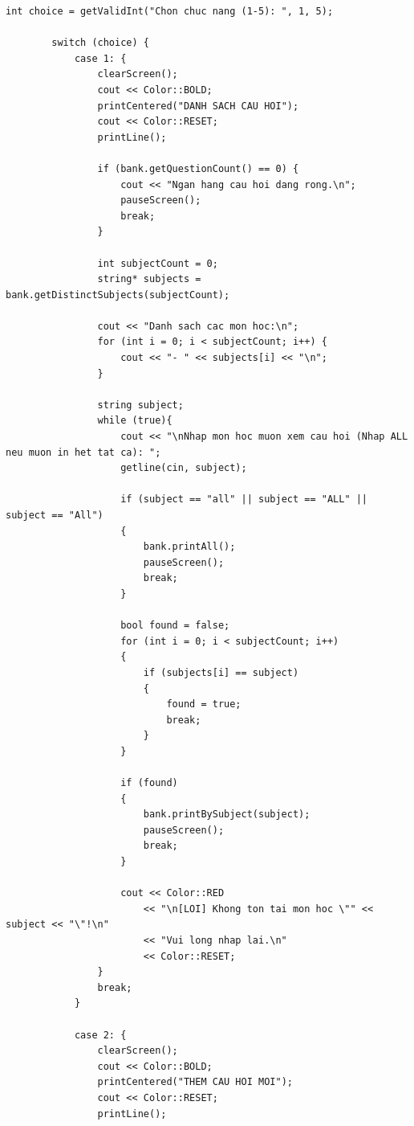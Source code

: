 \documentclass[11pt]{report}
\begin{document}
\begin{lstlisting}[caption={Menu.cpp -- Cài đặt giao diện Menu và điều hướng}, label={lst:full_menu_cpp}]
        int choice = getValidInt("Chon chuc nang (1-5): ", 1, 5);

        switch (choice) {
            case 1: {
                clearScreen();
                cout << Color::BOLD;
                printCentered("DANH SACH CAU HOI");
                cout << Color::RESET;
                printLine();

                if (bank.getQuestionCount() == 0) {
                    cout << "Ngan hang cau hoi dang rong.\n";
                    pauseScreen();
                    break;
                }

                int subjectCount = 0;
                string* subjects = bank.getDistinctSubjects(subjectCount);

                cout << "Danh sach cac mon hoc:\n";
                for (int i = 0; i < subjectCount; i++) {
                    cout << "- " << subjects[i] << "\n";
                }

                string subject;
                while (true){
                    cout << "\nNhap mon hoc muon xem cau hoi (Nhap ALL neu muon in het tat ca): ";
                    getline(cin, subject);

                    if (subject == "all" || subject == "ALL" || subject == "All")
                    {
                        bank.printAll();
                        pauseScreen();
                        break;
                    }

                    bool found = false;
                    for (int i = 0; i < subjectCount; i++)
                    {
                        if (subjects[i] == subject)
                        {
                            found = true;
                            break;
                        }
                    }

                    if (found)
                    {
                        bank.printBySubject(subject);
                        pauseScreen();
                        break;
                    }

                    cout << Color::RED
                        << "\n[LOI] Khong ton tai mon hoc \"" << subject << "\"!\n"
                        << "Vui long nhap lai.\n"
                        << Color::RESET;
                }
                break;
            }

            case 2: {
                clearScreen();
                cout << Color::BOLD;
                printCentered("THEM CAU HOI MOI");
                cout << Color::RESET;
                printLine();


\end{lstlisting}
\end{document}

